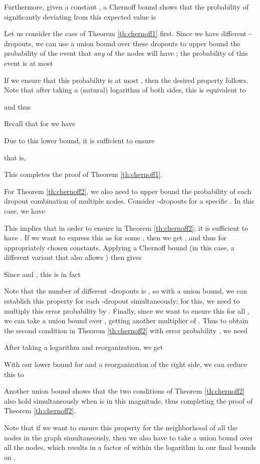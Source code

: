 \documentclass{article}
\begin{document}
Furthermore, given a constant , a Chernoff bound shows that the probability of significantly deviating from this expected value is


Let us consider the case of Theorem \ref{th:chernoff1} first. Since we have  different -dropouts, we can use a union bound over these dropouts to upper bound the probability of the event that \textit{any} of the nodes  will have ; the probability of this event is at most


If we ensure that this probability is at most , then the desired property follows. Note that after taking a (natural) logarithm of both sides, this is equivalent to

and thus

Recall that for  we have 

Due to this lower bound, it is sufficient to ensure

that is,

This completes the proof of Theorem \ref{th:chernoff1}.

For Theorem \ref{th:chernoff2}, we also need to upper bound the probability of each dropout combination of multiple nodes. Consider -dropouts for a specific . In this case, we have

This implies that in order to ensure  in Theorem \ref{th:chernoff2}, it is sufficient to have . If we want to express this as  for some , then we get , and thus  for appropriately chosen constants. Applying a Chernoff bound (in this case, a different variant that also allows ) then gives

Since  and , this is in fact

Note that the number of different -dropouts is , so with a union bound, we can establish this property for each -dropout simultaneously; for this, we need to multiply this error probability by . Finally, since we want to ensure this for all , we can take a union bound over , getting another multiplier of . Thus to obtain the second condition in Theorem \ref{th:chernoff2} with error probability , we need

After taking a logarithm and reorganization, we get

With our lower bound for  and a reorganization of the right side, we can reduce this to

Another union bound shows that the two conditions of Theorem \ref{th:chernoff2} also hold simultaneously when  is in this magnitude, thus completing the proof of Theorem \ref{th:chernoff2}.

Note that if we want to ensure this property for the neighborhood of all the  nodes in the graph simultaneously, then we also have to take a union bound over all the  nodes, which results in a factor of  within the logarithm in our final bounds on .
\end{document}
